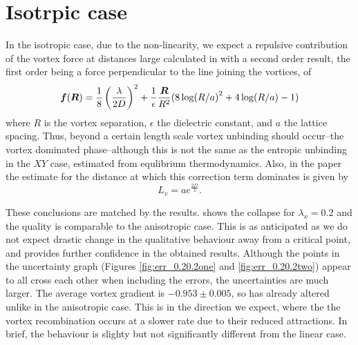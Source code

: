 \section{Isotrpic case}

In the isotropic case, due to the non-linearity, we expect a repulsive contribution of the vortex force at distances large calculated in \cite{PhysRevB.94.104520} with a second order result, the first order being a force perpendicular to the line joining the vortices, of 
\[
\boldsymbol{f}(\boldsymbol{R}) = \frac18 \left( \frac{\lambda}{2D}\right)^2 + \frac{1}{\epsilon} \frac{\boldsymbol{R}}{R^2}(8\log(R/a)^2 + 4\log(R/a)-1)
\]
where $R$ is the vortex separation, $\epsilon$ the dielectric constant, and $a$ the lattice spacing. Thus, beyond a certain length scale vortex unbinding should occur--the vortex dominated phase--although this is not the same as the entropic unbinding in the $XY$ case, estimated from equlibrium thermodynamics. Also, in the paper the estimate for the distance at which this correction term dominates is given by 
\[
L_v = ae^{\frac{2D}{\lambda}}.
\]

These conclusions are matched by the results. \fig{\ref{fig:binder_log_t_cL_0.20.2}} shows the collapse for $\lambda_x=0.2$ and the quality is comparable to the anisotropic case. This is as anticipated as we do not expect drastic change in the qualitative behaviour away from a critical point, and provides further confidence in the obtained results. Although the points in the uncertainty graph (Figures \ref{fig:err_0.20.2one} and \ref{fig:err_0.20.2two}) appear to all cross each other when including the errors, the uncertainties are much larger. The average vortex gradient is $-0.953 \pm 0.005$, so has already altered unlike in the anisotropic case. This is in the direction we expect, where the the vortex recombination occurs at a slower rate due to their reduced attractions. In brief, the behaviour is slighty but not significantly different from the linear case. 
 
